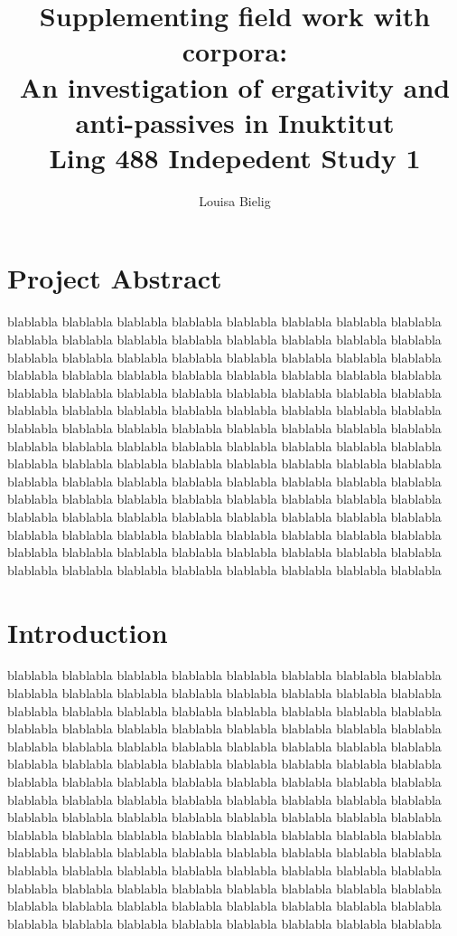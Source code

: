\documentclass[12pt]{article}
\title{Supplementing field work with corpora:\\ \vspace{2 mm} {\large An investigation of ergativity and anti-passives in Inuktitut\\ Ling 488 Indepedent Study 1}}
\author{Louisa Bielig}
\date{}
\begin{document}
\maketitle{} 

\tableofcontents

\section {Project Abstract}



blablabla blablabla blablabla 
blablabla blablabla blablabla 
blablabla blablabla blablabla 
blablabla blablabla blablabla 
blablabla blablabla blablabla 
blablabla blablabla blablabla 
blablabla blablabla blablabla 
blablabla blablabla blablabla 
blablabla blablabla blablabla 
blablabla blablabla blablabla 
blablabla blablabla blablabla 
blablabla blablabla blablabla 
blablabla blablabla blablabla 
blablabla blablabla blablabla 
blablabla blablabla blablabla 
blablabla blablabla blablabla 
blablabla blablabla blablabla 
blablabla blablabla blablabla 
blablabla blablabla blablabla 
blablabla blablabla blablabla 
blablabla blablabla blablabla 
blablabla blablabla blablabla 
blablabla blablabla blablabla 
blablabla blablabla blablabla 
blablabla blablabla blablabla 
blablabla blablabla blablabla 
blablabla blablabla blablabla 
blablabla blablabla blablabla 
blablabla blablabla blablabla 
blablabla blablabla blablabla 
blablabla blablabla blablabla 
blablabla blablabla blablabla 
blablabla blablabla blablabla 
blablabla blablabla blablabla 
blablabla blablabla blablabla 
blablabla blablabla blablabla 
blablabla blablabla blablabla 
blablabla blablabla blablabla 
blablabla blablabla blablabla 
blablabla blablabla blablabla 



\section {Introduction}


blablabla blablabla blablabla 
blablabla blablabla blablabla 
blablabla blablabla blablabla 
blablabla blablabla blablabla 
blablabla blablabla blablabla 
blablabla blablabla blablabla 
blablabla blablabla blablabla 
blablabla blablabla blablabla 
blablabla blablabla blablabla 
blablabla blablabla blablabla 
blablabla blablabla blablabla 
blablabla blablabla blablabla 
blablabla blablabla blablabla 
blablabla blablabla blablabla 
blablabla blablabla blablabla 
blablabla blablabla blablabla 
blablabla blablabla blablabla 
blablabla blablabla blablabla 
blablabla blablabla blablabla 
blablabla blablabla blablabla 
blablabla blablabla blablabla 
blablabla blablabla blablabla 
blablabla blablabla blablabla 
blablabla blablabla blablabla 
blablabla blablabla blablabla 
blablabla blablabla blablabla 
blablabla blablabla blablabla 
blablabla blablabla blablabla 
blablabla blablabla blablabla 
blablabla blablabla blablabla 
blablabla blablabla blablabla 
blablabla blablabla blablabla 
blablabla blablabla blablabla 
blablabla blablabla blablabla 
blablabla blablabla blablabla 
blablabla blablabla blablabla 
blablabla blablabla blablabla 
blablabla blablabla blablabla 
blablabla blablabla blablabla 
blablabla blablabla blablabla 
\end{document}
